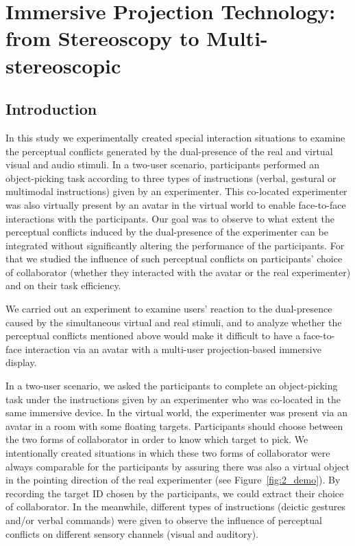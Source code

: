 \chapter{Immersive Projection Technology: from Stereoscopy to Multi-stereoscopic}
\label{chapter:multistereo}
\minitoc

\section{Introduction}
In this study we experimentally created special interaction situations to examine the perceptual conflicts generated by the dual-presence of the real and virtual visual and audio stimuli. In a two-user scenario, participants performed an object-picking task according to three types of instructions (verbal, gestural or multimodal instructions) given by an experimenter. This co-located experimenter was also virtually present by an avatar in the virtual world to enable face-to-face interactions with the participants. Our goal was to observe to what extent the perceptual conflicts induced by the dual-presence of the experimenter can be integrated without significantly altering the performance of the participants. For that we studied the influence of such perceptual conflicts on participants' choice of collaborator (whether they interacted with the avatar or the real experimenter) and on their task efficiency.

We carried out an experiment to examine users' reaction to the dual-presence caused by the simultaneous virtual and real stimuli, and to analyze whether the perceptual conflicts mentioned above would make it difficult to have a face-to-face interaction via an avatar with a multi-user projection-based immersive display.

In a two-user scenario, we asked the participants to complete an object-picking task under the instructions given by an experimenter who was co-located in the same immersive device. In the virtual world, the experimenter was present via an avatar in a room with some floating targets. Participants should choose between the two forms of collaborator in order to know which target to pick. We intentionally created situations in which these two forms of collaborator were always comparable for the participants by assuring there was also a virtual object in the pointing direction of the real experimenter (see Figure~\ref{fig:2_demo}). By recording the target ID chosen by the participants, we could extract their choice of collaborator. In the meanwhile, different types of instructions (deictic gestures and/or verbal commands) were given to observe the influence of perceptual conflicts on different sensory channels (visual and auditory).

